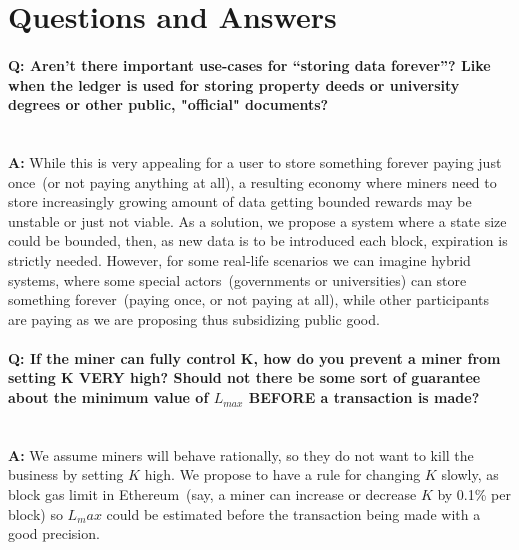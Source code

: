 \documentclass[]{llncs}   %
\begin{document}
\section{Questions and Answers}


\paragraph{\textbf{Q: } Aren't there important use-cases for ``storing data forever''? Like when the ledger is used for storing property deeds or university degrees or other public, "official" documents?}~\\
\textbf{A: } While this is very appealing for a user to store something forever paying just once~(or not paying anything at all), a resulting economy where miners need to store increasingly growing amount of data getting bounded rewards may be unstable or just not viable. As a solution, we propose a system where a state size could be bounded, then, as new data is to be introduced each block, expiration is strictly needed. However, for some real-life scenarios we can imagine hybrid systems, where some special actors~(governments or universities) can store something forever~(paying once, or not paying at all), while other participants are paying as we are proposing thus subsidizing public good.

\paragraph{\textbf{Q: } If the miner can fully control K, how do you prevent a miner from setting K VERY high? Should not there be some sort of guarantee about the minimum value of $L_{max}$ BEFORE a transaction is made?}~\\
\textbf{A: } We assume miners will behave rationally, so they do not want to kill the business by setting $K$ high. We propose to have a rule for changing $K$ slowly, as block gas limit in Ethereum~(say, a miner can increase or decrease $K$ by 0.1\% per block) so $L_max$ could be estimated before the transaction being made with a good precision.
\end{document}
